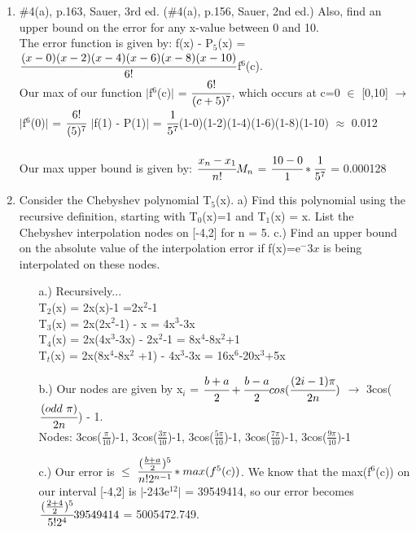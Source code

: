 \documentclass[12pt]{article}
\begin{document}
\begin{enumerate}
 	\item $\#$4(a), p.163, Sauer, 3rd ed. ($\#$4(a), p.156, Sauer, 2nd ed.) Also, find an upper bound on the error for any x-value between 0 and 10. \\
 	The error function is given by: f(x) - P$_5$(x) = $\cfrac{(x-0)(x-2)(x-4)(x-6)(x-8)(x-10)}{6!}$f$^6$(c). \\
 	Our max of our function $|$f$^6$(c)$|$ = $\cfrac{6!}{(c+5)^7}$, which occurs at c=0 $\in$ [0,10] $\rightarrow$ $|$f$^6$(0)$|$ = $\cfrac{6!}{(5)^7}$
 	$|$f(1) - P(1)$|$ = $\cfrac{1}{5^7}$(1-0)(1-2)(1-4)(1-6)(1-8)(1-10) $\approx$ 0.012 \\ \\
 	Our max upper bound is given by: $\cfrac{x_n-x_1}{n!}M_n$ = $\cfrac{10-0}{1}*\cfrac{1}{5^7}$ = 0.000128
 	
 	\item Consider the Chebyshev polynomial T$_5$(x). a) Find this polynomial using the recursive definition, starting with T$_0$(x)=1 and T$_1$(x) = x.  List the Chebyshev interpolation nodes on [-4,2] for n = 5. c.) Find an upper bound on the absolute value of the interpolation error if f(x)=e$^-3x$ is being interpolated on these nodes. \\
	\begin{itemize}
		\item[a.)] 	Recursively...\\
 	T$_2$(x) = 2x(x)-1 =2x$^2$-1 \\
 	T$_3$(x) = 2x(2x$^2$-1) - x = 4x$^3$-3x \\
 	T$_4$(x) = 2x(4x$^3$-3x) - 2x$^2$-1 = 8x$^4$-8x$^2$+1 \\
 	T$_t$(x) = 2x(8x$^4$-8x$^2$ +1) - 4x$^3$-3x = 16x$^6$-20x$^3$+5x \\
 		\item[b.)] Our nodes are given by x$_i$ = $\cfrac{b+a}{2} + \cfrac{b-a}{2}cos(\cfrac{(2i - 1)\pi}{2n})$ $\rightarrow$ 3cos($\cfrac{(odd \ \pi)}{2n}$) - 1. \\
 		Nodes: 3cos($\frac{\pi}{10}$)-1, 3cos($\frac{3\pi}{10}$)-1, 3cos($\frac{5\pi}{10}$)-1, 3cos($\frac{7\pi}{10}$)-1, 3cos($\frac{9\pi}{10}$)-1 \\
 		\item[c.)] Our error is $\leq$ $\cfrac{(\frac{b+a}{2})^5}{n!2^{n-1}} * max(f^5(c))$. We know that the max(f$^6$(c)) on our interval [-4,2] is $|$-243e$^{12}|$ = 39549414, so our error becomes $\cfrac{(\frac{2+4}{2})^5}{5!2^4}39549414$ = 5005472.749. 	\\
	\end{itemize}
	

\end{enumerate}
\end{document}
